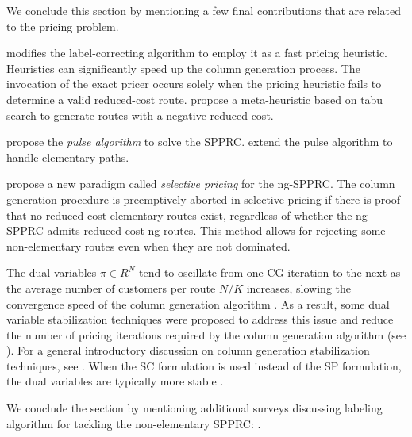 \medskip

We conclude this section by mentioning a few final contributions
that are related to the pricing problem.

\textcite{fukasawa2006} modifies the label-correcting algorithm
to employ it as a fast pricing heuristic.
Heuristics can significantly speed up the column generation process.
The invocation of the exact pricer occurs solely when the pricing heuristic
fails to determine a valid reduced-cost route.
\textcite{desaulniers2008, archetti2011} propose a meta-heuristic based on tabu search
to generate routes with a negative reduced cost.

\textcite{lozano2013} propose the \textit{pulse algorithm} to solve the SPPRC.
\textcite{lozano2016} extend the pulse algorithm to handle elementary paths.

\textcite{desaulniers2019} propose a new paradigm called \textit{selective pricing} for the ng-SPPRC.
The column generation procedure is preemptively aborted in selective pricing
if there is proof that no reduced-cost elementary routes exist,
regardless of whether the ng-SPPRC admits reduced-cost ng-routes.
This method allows for rejecting some non-elementary routes even when they are not dominated.

The dual variables $\pi \in R^N$ tend to oscillate from one CG iteration to the next
as the average number of customers per route $N / K$ increases,
slowing the convergence speed of the column generation algorithm \parencite{toth2014}.
As a result, some dual variable stabilization techniques were proposed to address this issue
and reduce the number of pricing iterations required by the column generation algorithm
(see \cite{dumerle1999, rousseau2007, pessoa2013, pessoa2018automation}).
For a general introductory discussion on column generation stabilization techniques, see \textcite{vanderbeck2005}.
When the SC formulation is used instead of the SP formulation,
the dual variables are typically more stable \parencite{rousseau2007, feillet2010}.

We conclude the section by mentioning additional surveys
discussing labeling algorithm for tackling the non-elementary SPPRC:
\textcite{irnich2005, pugliese2010, pugliese2013}.

\begin{comment}
// @NOTE(dparo): A useful note for myself. No need to be integrated in the thesis
\textcite{irnich2005}
4.1.1 Label Setting and Label Correcting Algorithms
The defining property of a
label setting algorithm is that those labels chosen to be extended (in the path extension step)
are kept until the end of the labeling process. They will not be identified as discardable in
subsequent calls of the dominance algorithm. Labeling algorithms that do not guarantee
this behavior are called label correcting algorithms. The general ideas of label setting as
well as label correcting algorithms in the context of the one-dimensional shortest path
problem (SPP) are, for instance, explained in the book of Ahuja et al. (1993).
\end{comment}
